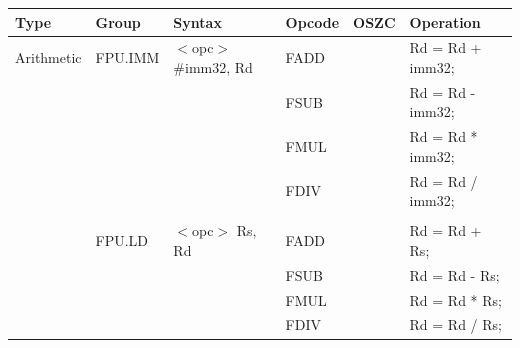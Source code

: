 \begin{table}
\begin{subtable}{\linewidth}
\begin{center}
\scriptsize
\begin{tabular}{llllll}
\hline
Type               & Group             & Syntax                                & Opcode            & OSZC              & Operation                                                                     \\ \hline
Arithmetic         & FPU.IMM           & $<$opc$>$ \#imm32, Rd                 & FADD              & \flags{-**-}      & Rd = Rd + imm32;                                                              \\
                   &                   &                                       & FSUB              & \flags{-**-}      & Rd = Rd - imm32;                                                              \\
                   &                   &                                       & FMUL              & \flags{-**-}      & Rd = Rd * imm32;                                                              \\
                   &                   &                                       & FDIV              & \flags{-**-}      & Rd = Rd / imm32;                                                              \\
                   &                   &                                       &                   &                   &                                                                               \\
                   & FPU.LD            & $<$opc$>$ Rs, Rd                      & FADD              & \flags{-**-}      & Rd = Rd + Rs;                                                                 \\
                   &                   &                                       & FSUB              & \flags{-**-}      & Rd = Rd - Rs;                                                                 \\
                   &                   &                                       & FMUL              & \flags{-**-}      & Rd = Rd * Rs;                                                                 \\
                   &                   &                                       & FDIV              & \flags{-**-}      & Rd = Rd / Rs;                                                                 \\

\end{tabular}
\end{center}
\end{subtable}
\end{table}
